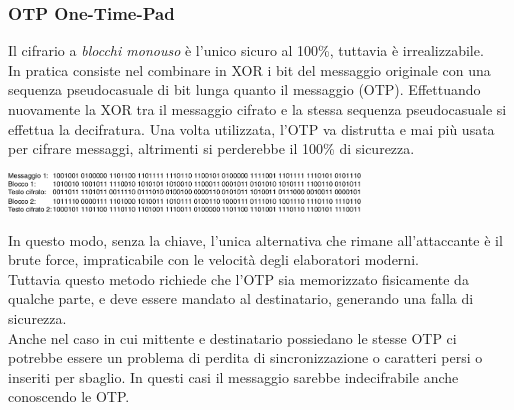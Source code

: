 \documentclass[10pt,a4paper,twoside]{article}
\begin{document}
\subsubsection{OTP One-Time-Pad}
Il cifrario a \textit{blocchi monouso} è l'unico sicuro al 100\%, tuttavia è irrealizzabile.\\
In pratica consiste nel combinare in XOR i bit del messaggio originale con una sequenza pseudocasuale di bit lunga quanto il messaggio (OTP). Effettuando nuovamente la XOR tra il messaggio cifrato e la stessa sequenza pseudocasuale si effettua la decifratura. Una volta utilizzata, l'OTP va distrutta e mai più usata per cifrare messaggi, altrimenti si perderebbe il 100\% di sicurezza.
\begin{center}
\includegraphics[width=0.7\textwidth]{images/otp.png}
\end{center}
In questo modo, senza la chiave, l'unica alternativa che rimane all'attaccante è il brute force, impraticabile con le velocità degli elaboratori moderni.\\
Tuttavia questo metodo richiede che l'OTP sia memorizzato fisicamente da qualche parte, e deve essere mandato al destinatario, generando una falla di sicurezza.\\
Anche nel caso in cui mittente e destinatario possiedano le stesse OTP ci potrebbe essere un problema di perdita di sincronizzazione o caratteri persi o inseriti per sbaglio. In questi casi il messaggio sarebbe indecifrabile anche conoscendo le OTP.
\end{document}
